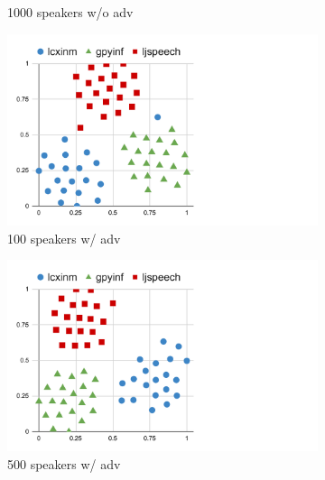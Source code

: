 \begin{figure}[!ht]
\begin{minipage}[b]{\linewidth}
\begin{subfigure}[b]{0.33\linewidth}
            \caption{1000 speakers w/o adv}
        \end{subfigure}   
    \end{minipage}
    \begin{minipage}[b]{\linewidth}
        \begin{subfigure}[b]{0.33\linewidth}
            \centering
            \includegraphics[width=\linewidth,trim=0 0 200 0,clip]{figure/5_dvector21.pdf}
            \caption{100 speakers w/ adv}
        \end{subfigure}        
        \begin{subfigure}[b]{0.33\linewidth}
            \centering
            \includegraphics[width=\linewidth,trim=0 0 200 0,clip]{figure/5_dvector22.pdf}
            \caption{500 speakers w/ adv}
        \end{subfigure}   
        \begin{subfigure}[b]{0.33\linewidth}
            \centering

\end{subfigure}
\end{minipage}
\end{figure}
